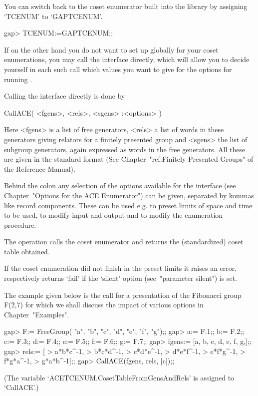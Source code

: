 You  can switch back  to the  coset enumerator  built into  the {\GAP}
library by assigning `TCENUM' to `GAPTCENUM'.

\begintt
gap> TCENUM:=GAPTCENUM;;
\endtt



If on  the other hand you  do not want  to set up {\ACE}  globally for
your coset  enumerations, you may call the  {\ACE} interface directly,
which will allow you to decide yourself in each such call which values
you want to give for the options for running {\ACE}.

Calling the {\ACE} interface directly is done by

\>CallACE( <fgens>, <rels>, <sgens> :<options> )

Here <fgens> is  a list of free generators, <rels> a  list of words in
these generators  giving relators for  a finitely presented  group and
<sgens> the list  of subgroup generators, again expressed  as words in
the free generators. All these are given in the standard {\GAP} format
(See Chapter~"ref:Finitely  Presented Groups" of  the {\GAP} Reference
Manual). 

Behind  the colon  any  selection  of the  options  available for  the
interface (see Chapter~"Options for the ACE Enumerator") can be given,
separated by kommas like record components.  These can be used e.g. to
preset limits of space and time to be used, to modify input and output
and to modify the enumeration procedure.

The  operation  calls the  {\ACE}  coset  enumerator  and returns  the
(standardized) coset table obtained.

If the coset enumeration did not finish in the preset limits it raises
an  error,   respectively  returns  `fail'  if   the  `silent'  option
(see~"parameter silent") is set.

The  example  given  below is  the  call  for  a presentation  of  the
Fibonacci  group F(2,7)  for  which  we shall  discuss  the impact  of
various options in Chapter~"Examples".

\begintt
gap> F:= FreeGroup( "a", "b", "c", "d", "e", "f", "g");;
gap> a:= F.1;; b:= F.2;; c:= F.3;; d:= F.4;; e:= F.5;; f:= F.6;; g:= F.7;;
gap> fgens:= [a, b, c, d, e, f, g,];;
gap> rels:= [
> a*b*c^-1,
> b*c*d^-1,
> c*d*e^-1,
> d*e*f^-1,
> e*f*g^-1,
> f*g*a^-1,
> g*a*b^-1];;
gap> CallACE(fgens, rels, [c]);;
\endtt

(The  variable  `ACETCENUM.CosetTableFromGensAndRels'  is assigned  to
`CallACE'.)

